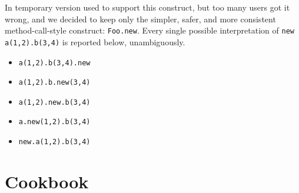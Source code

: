In temporary version  used to support this  construct,
but too many users got it wrong, and we decided to keep only the
simpler, safer, and more consistent method-call-style construct:
\lstinline{Foo.new}.  Every single possible interpretation of
\lstinline{new a(1,2).b(3,4)} is reported below, unambiguously.
\begin{itemize}
\item \lstinline{a(1,2).b(3,4).new}
\item \lstinline{a(1,2).b.new(3,4)}
\item \lstinline{a(1,2).new.b(3,4)}
\item \lstinline{a.new(1,2).b(3,4)}
\item \lstinline{new.a(1,2).b(3,4)}
\end{itemize}


\section{Cookbook}


